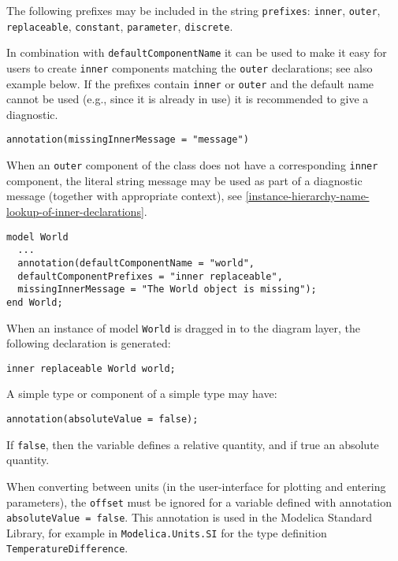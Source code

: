 The following prefixes may be included in the string \lstinline!prefixes!: \lstinline!inner!,
\lstinline!outer!, \lstinline!replaceable!, \lstinline!constant!, \lstinline!parameter!, \lstinline!discrete!.

\begin{nonnormative}
In combination with \lstinline!defaultComponentName! it can be used to make it easy for users to create \lstinline!inner! components
matching the \lstinline!outer! declarations; see also example below.  If the prefixes contain \lstinline!inner! or \lstinline!outer!
and the default name cannot be used (e.g., since it is already in use) it is recommended to give a diagnostic.
\end{nonnormative}

\begin{lstlisting}[language=modelica]
annotation(missingInnerMessage = "message")
\end{lstlisting}%

When an \lstinline!outer! component of the class does not have a corresponding \lstinline!inner!
component, the literal string message may be used as part of a diagnostic message (together with appropriate context), see
\cref{instance-hierarchy-name-lookup-of-inner-declarations}.

\begin{example}
\begin{lstlisting}[language=modelica]
model World
  ...
  annotation(defaultComponentName = "world",
  defaultComponentPrefixes = "inner replaceable",
  missingInnerMessage = "The World object is missing");
end World;
\end{lstlisting}
When an instance of model \lstinline!World! is dragged in to the diagram layer, the
following declaration is generated:
\begin{lstlisting}[language=modelica]
inner replaceable World world;
\end{lstlisting}
\end{example}

A simple type or component of a simple type may have:
\begin{lstlisting}[language=modelica]
annotation(absoluteValue = false);
\end{lstlisting}%

If \lstinline!false!, then the variable defines a relative quantity, and if true an absolute quantity.

\begin{nonnormative}
When converting between units (in the user-interface for plotting and entering parameters), the \lstinline!offset! must be
ignored for a variable defined with annotation \lstinline!absoluteValue = false!.
This annotation is used in the Modelica Standard Library, for example in
\lstinline!Modelica.Units.SI! for the type definition \lstinline!TemperatureDifference!.
\end{nonnormative}


